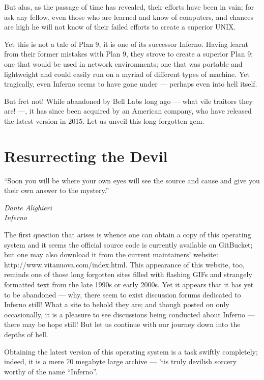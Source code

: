 \documentclass[a4paper,12pt]{report}
\begin{document}
But alas, as the passage of time has revealed, their efforts have been in vain; for ask any fellow, even those who are learned and know of computers, and chances are high he will not know of their failed efforts to create a superior UNIX.\@

Yet this is not a tale of Plan 9, it is one of its successor Inferno. Having learnt from their former mistakes with Plan 9, they strove to create a superior Plan 9; one that would be used in network environments; one that was portable and lightweight and could easily run on a myriad of different types of machine.
Yet tragically, even Inferno seems to have gone under — perhaps even into hell itself.

But fret not! While abandoned by Bell Labs long ago — what vile traitors they are! —, it has since been acquired by an American company, who have released the latest version in 2015. Let us unveil this long forgotten gem. \pagebreak

\chapter*{Resurrecting the Devil}

  \epigraph{``Soon you will be where your own eyes will see the source and cause and give you their own answer to the mystery.''}{\textit{Dante Alighieri\\Inferno}}

  The first question that arises is whence one can obtain a copy of this operating system and it seems the official source code is currently available on GitBucket; but one may also download it from the current maintainers' website: http://www.vitanuova.com/index.html. This appearance of this website, too, reminds one of those long forgotten sites filled with flashing GIFs and strangely formatted text from the late 1990s or early 2000s. Yet it appears that it has yet to be abandoned — why, there seem to exist discussion forums dedicated to Inferno still! What a site to behold they are; and though posted on only occasionally, it is a pleasure to see discussions being conducted about Inferno — there may be hope still! But let us continue with our journey down into the depths of hell.

  Obtaining the latest version of this operating system is a task swiftly completely; indeed, it is a mere 70 megabyte large archive — 'tis truly devilish sorcery worthy of the name  ``Inferno''.
\end{document}
